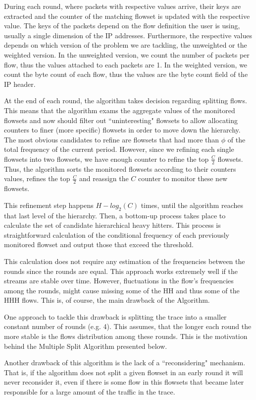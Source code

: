 During each round, where packets with respective values arrive, their keys are extracted and the counter of the matching flowset is updated with the respective value. The keys of the packets depend on the flow definition the user is using, usually a single dimension of the IP addresses.
Furthermore, the respective values depends on which version of the problem we are tackling, the unweighted or the weighted version. In the unweighted version, we count the number of packets per flow, thus the values attached to each packets are 1. In the weighted version, we count the byte count of each flow, thus the values are the byte count field of the IP header.

At the end of each round, the algorithm takes decision regarding splitting flows. This means that the algorithm exams the aggregate values of the monitored flowsets and now should  filter out ``uninteresting" flowsets to allow allocating counters to finer (more specific) flowsets in order to move down the hierarchy. The most obvious candidates to refine are flowsets that had more than $\phi$ of the total frequency of the current period. However, since we refining each single flowsets into two flowsets, we have enough counter to refine the top $\frac{C}{2}$ flowsets. Thus, the algorithm sorts the monitored flowsets according to their counters values, refines the top $\frac{C}{2}$ and reassign the $C$ counter to monitor these new flowsets.

This refinement step happens $H-log_2(C)$ times, until the algorithm reaches that last level of the hierarchy. Then, a bottom-up process takes place to calculate the set of candidate hierarchical heavy hitters. This process is straightforward calculation of the conditional frequency of each previously monitored flowset and output those that exceed the threshold.

This calculation does not require any estimation of the frequencies between the rounds since the rounds are equal. This approach works extremely well if the streams are stable over time.  However,  fluctuations in the flow's frequencies among the rounds, might cause missing some of the HH and thus some of the HHH flows. This is, of course, the main drawback of the \simpleAlgo Algorithm.

One approach to tackle this drawback is splitting the trace into a smaller constant number of rounds (e.g. 4). This assumes, that the longer each round the more stable is the flows distribution among these rounds. This is the motivation behind the Multiple Split Algorithm presented below.

Another drawback of this algorithm is the lack of a ``reconsidering" mechanism. That is, if the algorithm does not split a given flowset in an early round it will never reconsider it, even if there is some flow in this flowsets that became later responsible for a large amount of the traffic in the trace.


